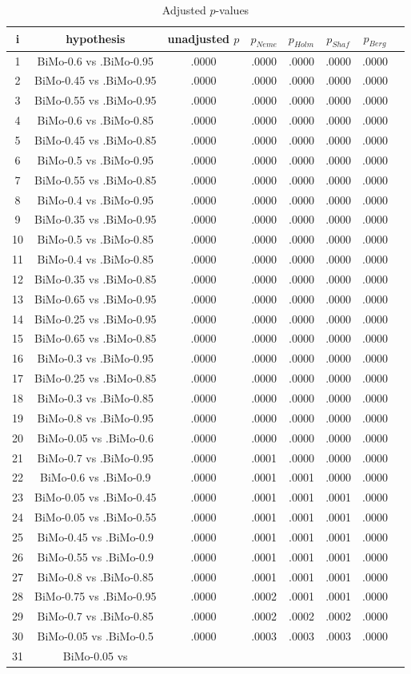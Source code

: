 \documentclass[a4paper,10pt]{article}
\begin{document}
\begin{landscape}
\begin{table}[!htp]
\centering\tiny
\caption{Adjusted $p$-values}
\begin{tabular}{cccccccc}
i&hypothesis&unadjusted $p$&$p_{Neme}$&$p_{Holm}$&$p_{Shaf}$&$p_{Berg}$\\
\hline
1&BiMo-0.6 vs .BiMo-0.95&.0000&.0000&.0000&.0000&.0000\\2&BiMo-0.45 vs .BiMo-0.95&.0000&.0000&.0000&.0000&.0000\\3&BiMo-0.55 vs .BiMo-0.95&.0000&.0000&.0000&.0000&.0000\\4&BiMo-0.6 vs .BiMo-0.85&.0000&.0000&.0000&.0000&.0000\\5&BiMo-0.45 vs .BiMo-0.85&.0000&.0000&.0000&.0000&.0000\\6&BiMo-0.5 vs .BiMo-0.95&.0000&.0000&.0000&.0000&.0000\\7&BiMo-0.55 vs .BiMo-0.85&.0000&.0000&.0000&.0000&.0000\\8&BiMo-0.4 vs .BiMo-0.95&.0000&.0000&.0000&.0000&.0000\\9&BiMo-0.35 vs .BiMo-0.95&.0000&.0000&.0000&.0000&.0000\\10&BiMo-0.5 vs .BiMo-0.85&.0000&.0000&.0000&.0000&.0000\\11&BiMo-0.4 vs .BiMo-0.85&.0000&.0000&.0000&.0000&.0000\\12&BiMo-0.35 vs .BiMo-0.85&.0000&.0000&.0000&.0000&.0000\\13&BiMo-0.65 vs .BiMo-0.95&.0000&.0000&.0000&.0000&.0000\\14&BiMo-0.25 vs .BiMo-0.95&.0000&.0000&.0000&.0000&.0000\\15&BiMo-0.65 vs .BiMo-0.85&.0000&.0000&.0000&.0000&.0000\\16&BiMo-0.3 vs .BiMo-0.95&.0000&.0000&.0000&.0000&.0000\\17&BiMo-0.25 vs .BiMo-0.85&.0000&.0000&.0000&.0000&.0000\\18&BiMo-0.3 vs .BiMo-0.85&.0000&.0000&.0000&.0000&.0000\\19&BiMo-0.8 vs .BiMo-0.95&.0000&.0000&.0000&.0000&.0000\\20&BiMo-0.05 vs .BiMo-0.6&.0000&.0000&.0000&.0000&.0000\\21&BiMo-0.7 vs .BiMo-0.95&.0000&.0001&.0000&.0000&.0000\\22&BiMo-0.6 vs .BiMo-0.9&.0000&.0001&.0001&.0000&.0000\\23&BiMo-0.05 vs .BiMo-0.45&.0000&.0001&.0001&.0001&.0000\\24&BiMo-0.05 vs .BiMo-0.55&.0000&.0001&.0001&.0001&.0000\\25&BiMo-0.45 vs .BiMo-0.9&.0000&.0001&.0001&.0001&.0000\\26&BiMo-0.55 vs .BiMo-0.9&.0000&.0001&.0001&.0001&.0000\\27&BiMo-0.8 vs .BiMo-0.85&.0000&.0001&.0001&.0001&.0000\\28&BiMo-0.75 vs .BiMo-0.95&.0000&.0002&.0001&.0001&.0000\\29&BiMo-0.7 vs .BiMo-0.85&.0000&.0002&.0002&.0002&.0000\\30&BiMo-0.05 vs .BiMo-0.5&.0000&.0003&.0003&.0003&.0000\\31&BiMo-0.05 vs 
\end{tabular}
\end{table}
\end{landscape}
\end{document}
